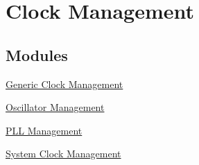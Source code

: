 \hypertarget{group__clk__group}{
\section{\-Clock \-Management}
\label{group__clk__group}
}
\subsection*{\-Modules}
\begin{DoxyCompactItemize}
\item 
\hyperlink{group__genclk__group}{\-Generic Clock Management}
\item 
\hyperlink{group__osc__group}{\-Oscillator Management}
\item 
\hyperlink{group__pll__group}{\-P\-L\-L Management}
\item 
\hyperlink{group__sysclk__group}{\-System Clock Management}
\end{DoxyCompactItemize}
